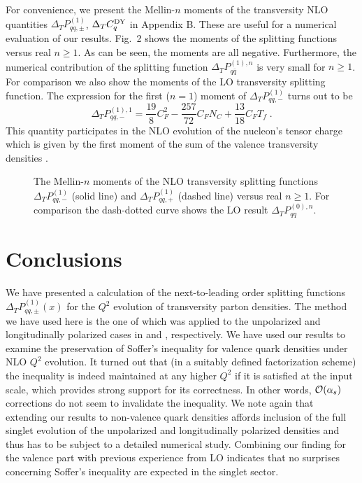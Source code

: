 For convenience, we present the Mellin-$n$ moments of the transversity
NLO quantities $\Delta_T P_{qq,\pm}^{(1)}$, $\Delta_T 
C_q^{{\small {\rm DY}}}$ in Appendix B. These are useful for a numerical
evaluation of our results. Fig.~2 shows the moments of the splitting 
functions versus real $n \geq 1$. As can be seen, the moments are all
negative. Furthermore, the numerical contribution of the splitting function
$\Delta_T P_{q\bar{q}}^{(1),n}$ is very small for $n\geq 1$. For comparison 
we also show the moments of the LO transversity splitting function. The 
expression for the first ($n=1$) moment of $\Delta_T P_{qq,-}^{(1)}$ turns 
out to be 
\begin{equation}
\Delta_T P_{qq,-}^{(1),1} = \frac{19}{8} C_F^2 - \frac{257}{72} C_F N_C
+\frac{13}{18} C_F T_f \; .
\end{equation}
This quantity participates in the NLO evolution of the nucleon's tensor 
charge which is given by the first moment of the sum of the valence 
transversity densities \cite{jaffe}.
\begin{figure}[htb]
\caption{The Mellin-$n$ moments of the NLO transversity splitting functions
$\Delta_T P_{qq,-}^{(1)}$ (solid line) and $\Delta_T P_{qq,+}^{(1)}$
(dashed line) versus real $n\geq 1$. For comparison the dash-dotted curve 
shows the LO result $\Delta_T P_{qq}^{(0),n}$.}
\end{figure}
\section{Conclusions}
We have presented a calculation of the next-to-leading order splitting 
functions $\Delta_T P_{qq,\pm}^{(1)}(x)$ for the $Q^2$ evolution of 
transversity parton densities. The method we have used here is the one of
\cite{egmpr,cfp} which was applied to the unpolarized and longitudinally
polarized cases in \cite{cfp,fp} and \cite{wv}, respectively.
We have used our results to examine the preservation of Soffer's inequality
for valence quark densities under NLO $Q^2$ evolution. It turned out that
(in a suitably defined factorization scheme)
the inequality is indeed maintained at any higher $Q^2$ if it is satisfied 
at the input scale, which provides strong support for its correctness.
In other words, ${\cal O} (\alpha_s)$ corrections do not seem to invalidate 
the inequality. We note again that extending 
our results to non-valence quark densities affords inclusion of the full
singlet evolution of the unpolarized and longitudinally polarized densities
and thus has to be subject to a detailed numerical study. Combining our 
finding for the valence part with previous experience from LO \cite{bar} 
indicates that no surprises concerning Soffer's inequality are expected in the 
singlet sector.
